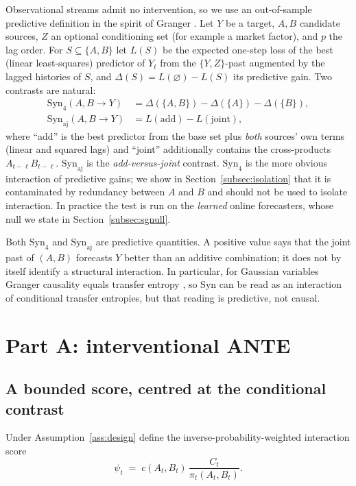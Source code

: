 \documentclass[pdflatex,sn-mathphys-ay]{sn-jnl}%
\theoremstyle{thmstyleone}%
\theoremstyle{thmstyletwo}%
\theoremstyle{thmstylethree}%
\newcommand{\Syn}{\mathrm{Syn}}
\begin{document}
Observational streams admit no intervention, so we use an out-of-sample predictive
definition in the spirit of Granger \citep{granger1969}. Let $Y$ be a target, $A,B$ candidate
sources, $Z$ an optional conditioning set (for example a market factor), and $p$ the lag
order. For $S\subseteq\{A,B\}$ let $L(S)$ be the expected one-step loss of the best
(linear least-squares) predictor of $Y_t$ from the $\{Y,Z\}$-past augmented by the lagged histories of $S$, and
$\Delta(S)=L(\varnothing)-L(S)$ its predictive gain. Two contrasts are natural:
\begin{align}
\Syn_{4}(A,B\!\to\!Y)&=\Delta(\{A,B\})-\Delta(\{A\})-\Delta(\{B\}), \label{eq:syn4}\\
\Syn_{\mathrm{aj}}(A,B\!\to\!Y)&=L(\mathrm{add})-L(\mathrm{joint}), \label{eq:synaj}
\end{align}
where ``add'' is the best predictor from the base set plus \emph{both} sources' own
terms (linear and squared lags) and ``joint'' additionally contains the cross-products
$A_{t-\ell}B_{t-\ell}$. $\Syn_{\mathrm{aj}}$ is the \emph{add-versus-joint} contrast.
$\Syn_4$ is the more obvious interaction of predictive gains; we show in
Section~\ref{subsec:isolation} that it is contaminated by redundancy between $A$ and
$B$ and should not be used to isolate interaction. In practice the test is run on the
\emph{learned} online forecasters, whose null we state in Section~\ref{subsec:sgnull}.

Both $\Syn_4$ and $\Syn_{\mathrm{aj}}$ are predictive quantities. A positive value says that
the joint past of $(A,B)$ forecasts $Y$ better than an additive combination; it does not by
itself identify a structural interaction. In particular, for Gaussian variables
Granger causality equals transfer entropy \citep{barnett2009}, so $\Syn$ can be read as an
interaction of conditional transfer entropies, but that reading is predictive, not causal.

\section{Part A: interventional ANTE}\label{sec:partA}

\subsection{A bounded score, centred at the conditional contrast}\label{subsec:score}

Under Assumption~\ref{ass:design} define the inverse-probability-weighted interaction score
\begin{equation}\label{eq:psi}
\psi_t \;=\; c(A_t,B_t)\,\frac{C_t}{\pi_t(A_t,B_t)} .
\end{equation}
\end{document}
